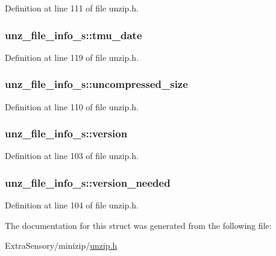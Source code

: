 Definition at line 111 of file unzip.\+h.

\hypertarget{structunz__file__info__s_ad52c08c65349f674b00244d81cdb1736}{
\subsubsection[{tmu\+\_\+date}]{ unz\+\_\+file\+\_\+info\+\_\+s\+::tmu\+\_\+date}}\label{structunz__file__info__s_ad52c08c65349f674b00244d81cdb1736}


Definition at line 119 of file unzip.\+h.

\hypertarget{structunz__file__info__s_a7696a98511bc57e389485e5313a9c2bf}{
\subsubsection[{uncompressed\+\_\+size}]{ unz\+\_\+file\+\_\+info\+\_\+s\+::uncompressed\+\_\+size}}\label{structunz__file__info__s_a7696a98511bc57e389485e5313a9c2bf}


Definition at line 110 of file unzip.\+h.

\hypertarget{structunz__file__info__s_a635f933b26b636d8314cef61af62fcef}{
\subsubsection[{version}]{ unz\+\_\+file\+\_\+info\+\_\+s\+::version}}\label{structunz__file__info__s_a635f933b26b636d8314cef61af62fcef}


Definition at line 103 of file unzip.\+h.

\hypertarget{structunz__file__info__s_a1578aca2bb7fed658f9f94c78d00288e}{
\subsubsection[{version\+\_\+needed}]{ unz\+\_\+file\+\_\+info\+\_\+s\+::version\+\_\+needed}}\label{structunz__file__info__s_a1578aca2bb7fed658f9f94c78d00288e}


Definition at line 104 of file unzip.\+h.



The documentation for this struct was generated from the following file\+:\begin{DoxyCompactItemize}
\item 
Extra\+Sensory/minizip/\hyperlink{unzip_8h}{unzip.\+h}\end{DoxyCompactItemize}
